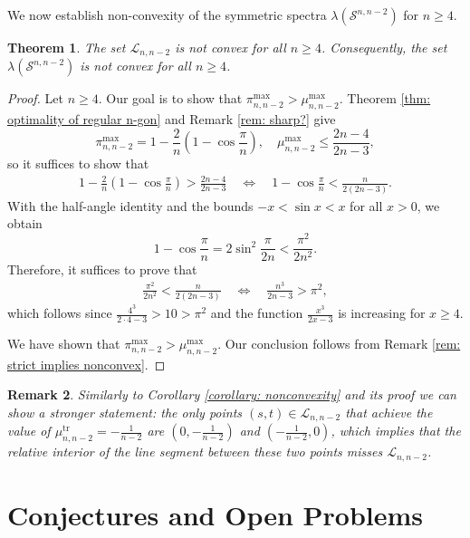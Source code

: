 \documentclass[reqno,hidelinks,11pt]{amsart}
\numberwithin{equation}{section}
\newtheorem{theorem}{Theorem}[section]
\newtheorem{remark}[theorem]{Remark}
\def\S{\mathcal{S}}
\def\tr{\operatorname{tr}}
\begin{document}
We now establish non-convexity of the symmetric spectra $\lambda(\S^{n, n-2})$ for $n \geq 4$.

\begin{theorem}\label{thm: non-convexity d=n-2} The set $\mathcal{L}_{n, n-2}$ is not convex for all $n \geq 4$. Consequently, the set $\lambda(\S^{n, n-2})$ is not convex for all $n \geq 4$.
\end{theorem}

\begin{proof}
Let $n \geq 4$. Our goal is to show that $\pi_{n,n-2}^{\max} > \mu_{n, n - 2}^{\max}$. Theorem \ref{thm: optimality of regular n-gon} and Remark \ref{rem: sharp?} give
\[\pi_{n,n-2}^{\max} = 1-\frac{2}{n}\left( 1- \cos \frac{\pi}{n} \right), \quad \mu_{n, n - 2}^{\max} \leq \frac{2n - 4}{2n - 3},\]
so it suffices to show that
\begin{align*}
1 - \frac{2}{n}\left( 1- \cos \frac{\pi}{n} \right) > \frac{2n-4}{2n-3} \quad \Leftrightarrow \quad 1- \cos \frac{\pi}{n}  < \frac{n}{2(2n-3)}.
\end{align*}
With the half-angle identity and the bounds $-x < \sin x < x $ for all $x > 0$, we obtain 
\[ 1- \cos \frac{\pi}{n} = 2  \sin^2 \frac{\pi}{2n} < \frac{\pi^2}{2n^2}.\]
Therefore, it suffices to prove that
\begin{align*}
\frac{\pi^2}{2n^2} < \frac{n}{2(2n - 3)} \quad
\Leftrightarrow \quad    \frac{n^3}{2n-3} > \pi^2,
\end{align*}
which follows since $\frac{4^3}{2\cdot4-3}>10>\pi^2$ and the function $\frac{x^3}{2x-3}$ is increasing for $x\ge4$.

We have shown that $\pi_{n,n-2}^{\max} > \mu_{n,n-2}^{\max}$. Our conclusion follows from Remark \ref{rem: strict implies nonconvex}.
\end{proof}

\begin{remark}
Similarly to Corollary \ref{corollary: nonconvexity} and its proof we can show a stronger statement: the only points $(s, t) \in \mathcal{L}_{n, n - 2}$ that achieve the value of $\mu_{n,n-2}^{\tr} = -\frac{1}{n-2}$ are $(0, -\frac{1}{n-2})$ and $(-\frac{1}{n-2}, 0)$, which implies that the relative interior of the line segment between these two points misses $\mathcal{L}_{n, n -2}$.
\end{remark}


\section{Conjectures and Open Problems}
\end{document}
